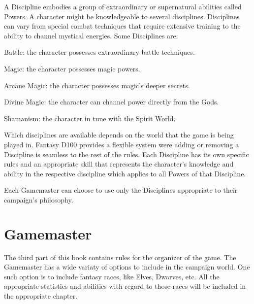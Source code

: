 A Discipline embodies a group of extraordinary or supernatural abilities called Powers. A character might be knowledgeable to several disciplines. Disciplines can vary from special combat techniques that require extensive training to the ability to channel mystical energies. Some Disciplines are:
\begin{rpg-list}
\item Battle: the character possesses extraordinary battle techniques.
\item Magic: the character possesses magic powers.
\item Arcane Magic: the character possesses magic's deeper secrets.
\item Divine Magic: the character can channel power directly from the Gods.
\item Shamanism: the character in tune with the Spirit World.
\end{rpg-list}

Which disciplines are available depends on the world that the game is being played in. Fantasy D100 provides a flexible system were adding or removing a Discipline is seamless to the rest of the rules. Each Discipline has its own specific rules and an appropriate skill that represents the character's knowledge and ability in the respective discipline which applies to all Powers of that Discipline.

Each Gamemaster can choose to use only the Disciplines appropriate to their campaign's philosophy.


\section{Gamemaster}
The third part of this book contains rules for the organizer of the game. The Gamemaster has a wide variaty of options to include in the campaign world. One such option is to include fantasy races, like Elves, Dwarves, etc. All the appropriate statistics and abilities with regard to those races will be included in the appropriate chapter.


